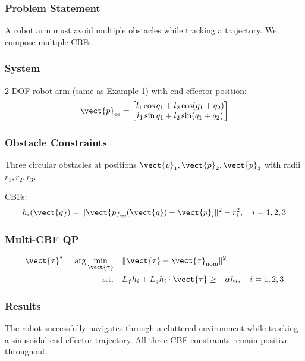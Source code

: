 \subsubsection{Problem Statement}

A robot arm must avoid multiple obstacles while tracking a trajectory. We compose multiple CBFs.

\subsubsection{System}

2-DOF robot arm (same as Example 1) with end-effector position:
\begin{equation}
\vect{p}_{\text{ee}} = \begin{bmatrix} l_1 \cos q_1 + l_2 \cos(q_1 + q_2) \\ l_1 \sin q_1 + l_2 \sin(q_1 + q_2) \end{bmatrix}
\end{equation}

\subsubsection{Obstacle Constraints}

Three circular obstacles at positions $\vect{p}_1, \vect{p}_2, \vect{p}_3$ with radii $r_1, r_2, r_3$.

CBFs:
\begin{equation}
h_i(\vect{q}) = \|\vect{p}_{\text{ee}}(\vect{q}) - \vect{p}_i\|^2 - r_i^2, \quad i = 1, 2, 3
\end{equation}

\subsubsection{Multi-CBF QP}

\begin{align}
\vect{\tau}^* = \arg\min_{\vect{\tau}} \quad & \|\vect{\tau} - \vect{\tau}_{\text{nom}}\|^2 \\
\text{s.t.} \quad & L_f h_i + L_g h_i \cdot \vect{\tau} \geq -\alpha h_i, \quad i = 1, 2, 3
\end{align}

\subsubsection{Results}

The robot successfully navigates through a cluttered environment while tracking a sinusoidal end-effector trajectory. All three CBF constraints remain positive throughout.


